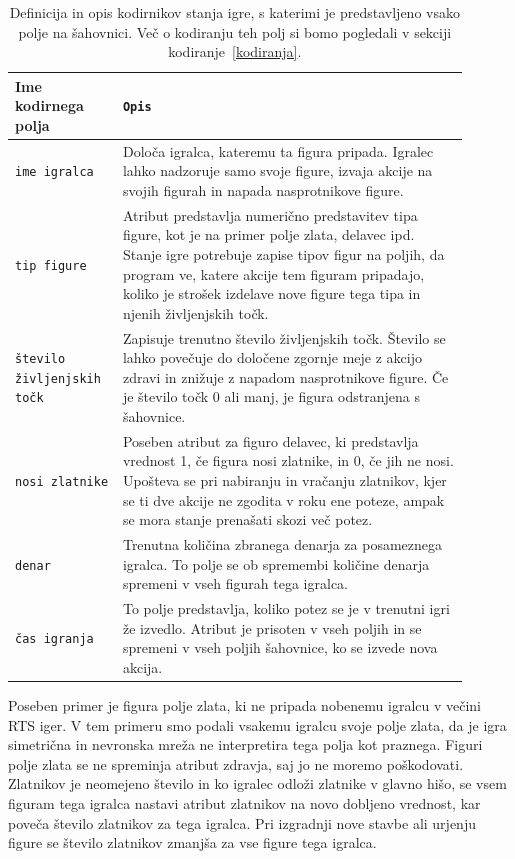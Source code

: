 \documentclass[a4paper, 12pt]{book}
\begin{document}
{\begin{table}
	\begin{center}
		\begin{tabular}{p{0.2\linewidth}|p{0.7\linewidth}}
			Ime kodirnega polja                      & {\tt Opis} \\ \hline
			{\tt ime igralca}                        & Določa igralca, kateremu ta figura pripada. 
			 										   Igralec lahko nadzoruje samo svoje figure, izvaja akcije na svojih figurah in napada nasprotnikove figure. \\
			{\tt tip figure}                         & Atribut predstavlja numerično predstavitev tipa figure, kot je na primer polje zlata, delavec ipd.
													   Stanje igre potrebuje zapise tipov figur na poljih, da program ve, katere akcije tem figuram pripadajo, koliko je strošek izdelave nove figure tega tipa in njenih življenjskih točk.\\
			{\tt število življenjskih točk}          & Zapisuje trenutno število življenjskih točk.
													   Število se lahko povečuje do določene zgornje meje z akcijo zdravi in znižuje z napadom nasprotnikove figure. Če je število točk 0 ali manj, je figura odstranjena s šahovnice. \\
			{\tt nosi zlatnike}                      & Poseben atribut za figuro delavec, ki predstavlja vrednost 1, če figura nosi zlatnike, in 0, če jih ne nosi.
													   Upošteva se pri nabiranju in vračanju zlatnikov, kjer se ti dve akcije ne zgodita v roku ene poteze, ampak se mora stanje prenašati skozi več potez. \\
			{\tt denar}                              & Trenutna količina zbranega denarja za posameznega igralca.
													   To polje se ob spremembi količine denarja spremeni v vseh figurah tega igralca. \\
			{\tt čas igranja}                        & To polje predstavlja, koliko potez se je v trenutni igri že izvedlo.
													   Atribut je prisoten v vseh poljih in se spremeni v vseh poljih šahovnice, ko se izvede nova akcija. \\
		\end{tabular}
	\end{center}
	\caption{Definicija in opis kodirnikov stanja igre, s katerimi je predstavljeno vsako polje na šahovnici. Več o kodiranju teh polj si bomo pogledali v sekciji kodiranje~\ref{kodiranja}.}
	\label{tableEncoders}
\end{table}

Poseben primer je figura polje zlata, ki ne pripada nobenemu igralcu v večini RTS iger. 
V tem primeru smo podali vsakemu igralcu svoje polje zlata, da je igra simetrična in nevronska mreža ne interpretira tega polja kot praznega.
Figuri polje zlata se ne spreminja atribut zdravja, saj jo ne moremo poškodovati. 
Zlatnikov je neomejeno število in ko igralec odloži zlatnike v glavno hišo, se vsem figuram tega igralca nastavi atribut zlatnikov na novo dobljeno vrednost, kar poveča število zlatnikov za tega igralca. 
Pri izgradnji nove stavbe ali urjenju figure se število zlatnikov zmanjša za vse figure tega igralca.

}
\end{document}
